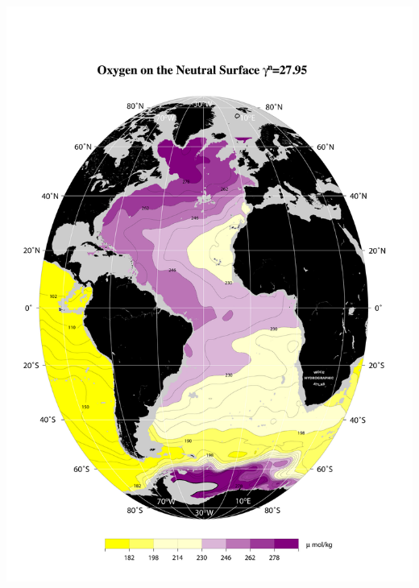 \documentclass{beamer}
\begin{document}
\begin{frame}[plain,t]
\begin{columns}
\begin{column}{0.5\textwidth}
          \includegraphics[width=\textwidth]{oxygen_isopyc_jpg/gam2795_oxy.jpg}  
      \end{column}
    \end{columns} 
\end{frame}
\end{document}
